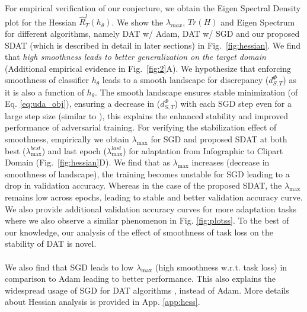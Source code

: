 \documentclass[table,dvipsnames]{article}
\theoremstyle{plain}
\theoremstyle{definition}
\theoremstyle{remark}
\begin{document}
For empirical verification of our conjecture, we obtain the Eigen Spectral Density plot for the Hessian $\hat{R}^l_{T}(h_{\theta})$. We show the $\lambda_{max}$, $Tr(H)$ and Eigen Spectrum for different algorithms, namely DAT w/ Adam, DAT w/ SGD and our proposed SDAT (which is described in detail in later sections) in Fig.\ \ref{fig:hessian}. We find that \textit{high smoothness leads to better generalization on the target domain} (Additional empirical evidence in Fig.\ \ref{fig:2}A). We hypothesize that enforcing smoothness of classifier $h_{\theta}$ leads to a smooth landscape for discrepancy ($d_{S,T}^{\Phi}$)  as it is also a function of $h_{\theta}$. The smooth landscape ensures stable minimization (of Eq. \ref{eq:uda_obj}), ensuring a decrease in ($d_{S,T}^{\Phi}$)  with each SGD step even for a large step size (similar to \citep{chu2020smoothness}), this explains the enhanced stability and improved performance of adversarial training. For verifying the stabilization effect of smoothness, empirically we obtain $\lambda_{\max}$ for SGD and proposed SDAT at both best ($\lambda_{\max}^{best}$) and last epoch ($\lambda_{\max}^{last}$) for adaptation from Infographic to Clipart Domain (Fig.\ \ref{fig:hessian}\textcolor{mydarkblue}{D}). We find that as $\lambda_{\max}$ increases (decrease in smoothness of landscape), the training becomes unstable for SGD leading to a drop in validation accuracy. Whereas in the case of the proposed SDAT, the $\lambda_{\max}$ remains low across epochs, leading to stable and better validation accuracy curve. We also provide additional validation accuracy curves for more adaptation tasks where we also observe a similar phenomenon in Fig. \ref{fig:plotss}. To the best of our knowledge, our analysis of the effect of smoothness of task loss on the stability of DAT is novel. \\
\\
We also find that SGD leads to low $\lambda_{\max}$ (high smoothness w.r.t. task loss) in comparison to Adam leading to better performance. This also explains the widespread usage of SGD for DAT algorithms \citep{ganin2015unsupervised, long2018conditional, saito2018adversarial}, instead of Adam. More details about Hessian analysis is provided in App. \ref{app:hess}.
\end{document}
